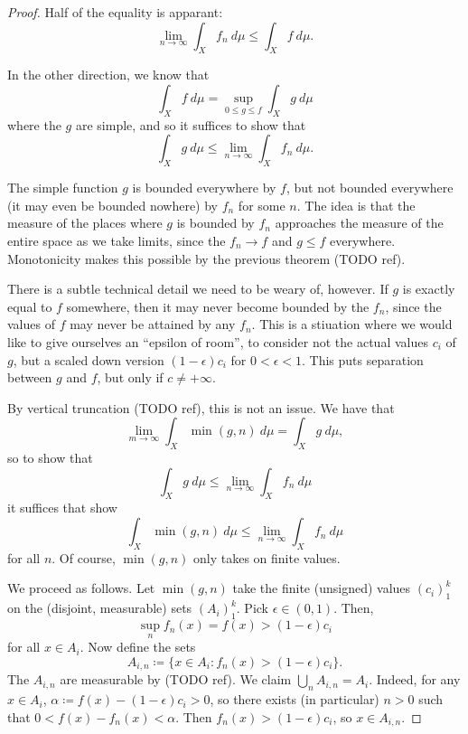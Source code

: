 \documentclass[12pt]{article}
\begin{document}
\begin{proof}
	Half of the equality is apparant:
	\begin{equation*}
		\lim_{n\to\infty}\int_X f_n\ d\mu\leq\int_X f\ d\mu.
	\end{equation*}

	In the other direction, we know that 
	\begin{equation*}
		\int_X f\ d\mu=\sup_{0\leq g\leq f}\int_X g\ d\mu
	\end{equation*}
	where the $g$ are simple, and so it suffices to show that 
	\begin{equation*}
		\int_X g\ d\mu\leq\lim_{n\to\infty}\int_X f_n\ d\mu.
	\end{equation*}

	The simple function $g$ is bounded everywhere by $f$, but not bounded everywhere (it may even be bounded nowhere) by $f_n$ for some $n$. The idea is that the measure of the places where $g$ is bounded by $f_n$ approaches the measure of the entire space as we take limits, since the $f_n\to f$ and $g\leq f$ everywhere. Monotonicity makes this possible by the previous theorem (TODO ref).

	There is a subtle technical detail we need to be weary of, however. If $g$ is exactly equal to $f$ somewhere, then it may never become bounded by the $f_n$, since the values of $f$ may never be attained by any $f_n$. This is a stiuation where we would like to give ourselves an ``epsilon of room'', to consider not the actual values $c_i$ of $g$, but a scaled down version $(1-\epsilon)c_i$ for $0<\epsilon<1$. This puts separation between $g$ and $f$, but only if $c \neq +\infty$.  

	By vertical truncation (TODO ref), this is not an issue. We have that 
	\begin{equation*}
		\lim_{m\to\infty}\int_X \min(g,n)\ d\mu = \int_X g\ d\mu,
	\end{equation*}
	so to show that
	\begin{equation*}
		\int_X g\ d\mu\leq\lim_{n\to\infty}\int_X f_n\ d\mu
	\end{equation*}
	it suffices that show 
	\begin{equation*}
		\int_X \min(g,n)\ d\mu\leq\lim_{n\to\infty}\int_X f_n\ d\mu
	\end{equation*}
	for all $n$. Of course, $\min(g,n)$ only takes on finite values.

	We proceed as follows. Let $\min(g,n)$ take the finite (unsigned) values $(c_i)_1^k$ on the (disjoint, measurable) sets $(A_i)_1^k$. Pick $\epsilon\in(0,1)$. Then, 
	\begin{equation*}
		\sup_n f_n(x)=f(x)>(1-\epsilon)c_i
	\end{equation*}
	for all $x\in A_i$. Now define the sets 
	\begin{equation*}
		A_{i,n}\coloneqq\{x\in A_i: f_n(x)>(1-\epsilon)c_i\}.
	\end{equation*}
	The $A_{i,n}$ are measurable by (TODO ref). We claim $\bigcup_n A_{i,n}=A_i$. Indeed, for any $x\in A_i$, $\alpha\coloneqq f(x)-(1-\epsilon)c_i>0$, so there exists (in particular) $n>0$ such that $0<f(x)-f_n(x)<\alpha$. Then $f_n(x)>(1-\epsilon)c_i$, so $x\in A_{i,n}$. 


\end{proof}
\end{document}
